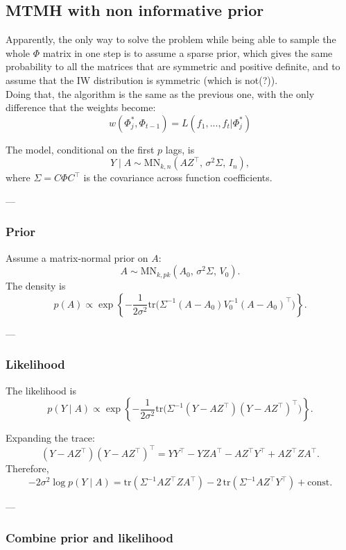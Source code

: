 \subsection{MTMH with non informative prior}
Apparently, the only way to solve the problem while being able to sample the whole $\Phi$ matrix in one step is to assume a sparse prior, which gives the same probability to all the matrices that are symmetric and positive definite, and to assume that the IW distribution is symmetric (which is not(?)). \\
Doing that, the algorithm is the same as the previous one, with the only difference that the weights become: 
\begin{equation}
    w(\Phi_j^*, \Phi_{t-1}) = L(f_1, ..., f_t|\Phi_j^*) 
\end{equation}


The model, conditional on the first \(p\) lags, is
\[
Y \mid A \sim \mathrm{MN}_{k,n}(A Z^\top, \, \sigma^2 \Sigma, \, I_n),
\]
where \(\Sigma = C \Phi C^\top\) is the covariance across function coefficients.

---

\subsubsection{Prior}

Assume a matrix-normal prior on \(A\):
\[
A \sim \mathrm{MN}_{k,pk}(A_0, \, \sigma^2 \Sigma, \, V_0).
\]
The density is
\[
p(A) \propto
\exp\!\left\{
-\frac{1}{2\sigma^2}
\mathrm{tr}\!\big(
\Sigma^{-1} (A - A_0) V_0^{-1} (A - A_0)^\top
\big)
\right\}.
\]

---

\subsubsection{Likelihood}

The likelihood is
\[
p(Y \mid A) \propto
\exp\!\left\{
-\frac{1}{2\sigma^2}
\mathrm{tr}\!\big(
\Sigma^{-1} (Y - A Z^\top)(Y - A Z^\top)^\top
\big)
\right\}.
\]

Expanding the trace:
\[
(Y - A Z^\top)(Y - A Z^\top)^\top
= YY^\top - YZ A^\top - A Z^\top Y^\top + A Z^\top Z A^\top.
\]
Therefore,
\[
-2\sigma^2 \log p(Y \mid A)
= \mathrm{tr}(\Sigma^{-1} A Z^\top Z A^\top)
- 2\, \mathrm{tr}(\Sigma^{-1} A Z^\top Y^\top) + \text{const.}
\]

---

\subsubsection{Combine prior and likelihood}

